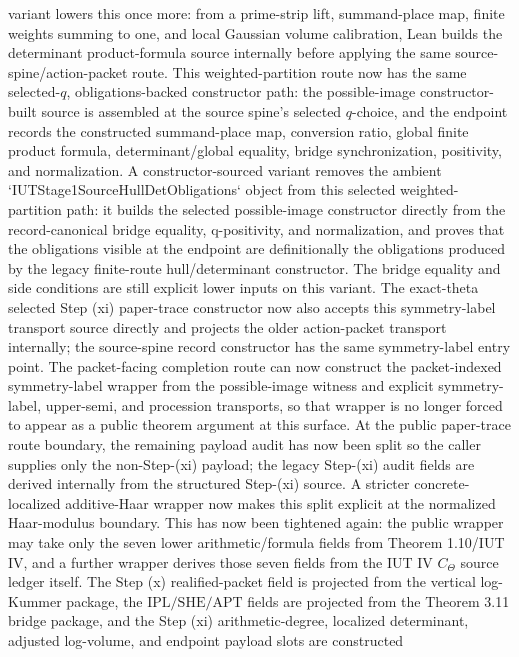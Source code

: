 \documentclass[11pt]{article}
\newcommand{\SHE}{\ensuremath{\mathrm{SHE}}}
\newcommand{\IPL}{\ensuremath{\mathrm{IPL}}}
\newcommand{\APT}{\ensuremath{\mathrm{APT}}}
\theoremstyle{plain}
\theoremstyle{definition}
\theoremstyle{remark}
\begin{document}
variant lowers this once more: from a prime-strip lift, summand-place map,
finite weights summing to one, and local Gaussian volume calibration, Lean
builds the determinant product-formula source internally before applying the
same source-spine/action-packet route.  This weighted-partition route now has
the same selected-\(q\), obligations-backed constructor path: the possible-image
constructor-built source is assembled at the source spine's selected
\(q\)-choice, and the endpoint records the constructed summand-place map,
conversion ratio, global finite product formula, determinant/global equality,
bridge synchronization, positivity, and normalization.  A constructor-sourced
variant removes the ambient `IUTStage1SourceHullDetObligations` object from
this selected weighted-partition path: it builds the selected possible-image
constructor directly from the record-canonical bridge equality, q-positivity,
and normalization, and proves that the obligations visible at the endpoint are
definitionally the obligations produced by the legacy finite-route
hull/determinant constructor.  The bridge equality and side conditions are
still explicit lower inputs on this variant.
The exact-theta selected Step (xi) paper-trace constructor now
also accepts this symmetry-label transport source directly and projects the
older action-packet transport internally; the source-spine record constructor
has the same symmetry-label entry point.  The packet-facing completion route can
now construct the packet-indexed symmetry-label wrapper from the possible-image
witness and explicit symmetry-label, upper-semi, and procession transports, so
that wrapper is no longer forced to appear as a public theorem argument at this
surface.  At the public paper-trace route boundary, the remaining payload audit
has now been split so the caller supplies
only the non-Step-(xi) payload; the legacy Step-(xi) audit fields are derived
internally from the structured Step-(xi) source.  A stricter concrete-localized
additive-Haar wrapper now makes this split explicit at the normalized
Haar-modulus boundary.  This has now been tightened again: the public wrapper
may take only the seven lower arithmetic/formula fields from Theorem 1.10/IUT IV,
and a further wrapper derives those seven fields from the IUT IV \(C_{\Theta}\)
source ledger itself.
The Step (x) realified-packet field is projected from the vertical
log-Kummer package, the \(\IPL/\SHE/\APT\) fields are projected from the
Theorem 3.11 bridge package, and the Step (xi) arithmetic-degree, localized
determinant, adjusted log-volume, and endpoint payload slots are constructed
\end{document}
